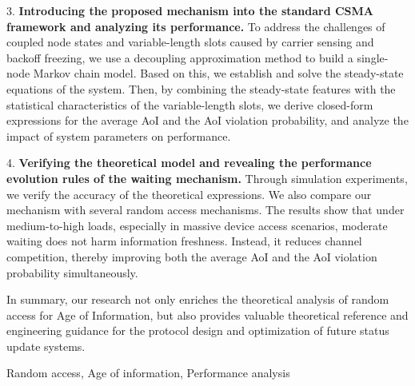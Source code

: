 \begin{abstractEN}
3. \textbf{Introducing the proposed mechanism into the standard CSMA framework and analyzing its performance.} To address the challenges of coupled node states and variable-length slots caused by carrier sensing and backoff freezing, we use a decoupling approximation method to build a single-node Markov chain model. Based on this, we establish and solve the steady-state equations of the system. Then, by combining the steady-state features with the statistical characteristics of the variable-length slots, we derive closed-form expressions for the average AoI and the AoI violation probability, and analyze the impact of system parameters on performance.

4. \textbf{Verifying the theoretical model and revealing the performance evolution rules of the waiting mechanism.} Through simulation experiments, we verify the accuracy of the theoretical expressions. We also compare our mechanism with several random access mechanisms. The results show that under medium-to-high loads, especially in massive device access scenarios, moderate waiting does not harm information freshness. Instead, it reduces channel competition, thereby improving both the average AoI and the AoI violation probability simultaneously.

In summary, our research not only enriches the theoretical analysis of random access for Age of Information, but also provides valuable theoretical reference and engineering guidance for the protocol design and optimization of future status update systems.

\end{abstractEN}
\begin{keywordEN}
Random access, Age of information, Performance analysis
\end{keywordEN}
